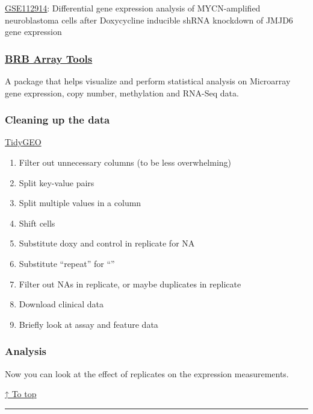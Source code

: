 \documentclass[]{article}
\providecommand{\tightlist}{%
  \setlength{\itemsep}{0pt}\setlength{\parskip}{0pt}}
\begin{document}
\href{https://www.ncbi.nlm.nih.gov/geo/query/acc.cgi?acc=GSE112914}{GSE112914}:
Differential gene expression analysis of MYCN-amplified neuroblastoma
cells after Doxycycline inducible shRNA knockdown of JMJD6 gene
expression

\subsubsection{\texorpdfstring{\href{https://brb.nci.nih.gov/BRB-ArrayTools/}{BRB
Array Tools}}{BRB Array Tools}}\label{brb-array-tools}

A package that helps visualize and perform statistical analysis on
Microarray gene expression, copy number, methylation and RNA-Seq data.

\hypertarget{geo-cleaning-steps}{\subsubsection{Cleaning up the
data}\label{geo-cleaning-steps}}

\href{https://tidygeo.shinyapps.io/tidygeo/}{TidyGEO}

\begin{enumerate}
\def\labelenumi{\arabic{enumi}.}
\tightlist
\item
  Filter out unnecessary columns (to be less overwhelming)
\item
  Split key-value pairs
\item
  Split multiple values in a column
\item
  Shift cells
\item
  Substitute doxy and control in replicate for NA
\item
  Substitute ``repeat'' for ``''
\item
  Filter out NAs in replicate, or maybe duplicates in replicate
\item
  Download clinical data
\item
  Briefly look at assay and feature data
\end{enumerate}

\hypertarget{example}{\subsubsection{Analysis}\label{example}}

Now you can look at the effect of replicates on the expression
measurements.

\protect\hyperlink{contents}{↑ To top}

\begin{center}\rule{0.5\linewidth}{\linethickness}\end{center}
\end{document}
